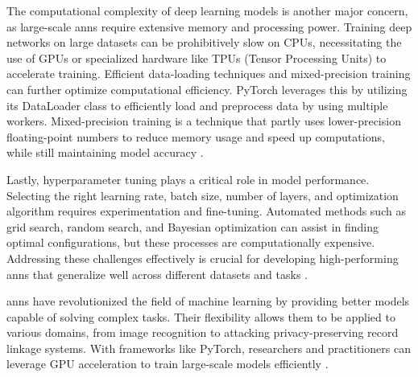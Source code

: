 The computational complexity of deep learning models is another major concern, as large-scale \ac{ann}s require extensive memory and processing power.
Training deep networks on large datasets can be prohibitively slow on CPUs, necessitating the use of GPUs or specialized hardware like TPUs (Tensor Processing Units) to accelerate training.
Efficient data-loading techniques and mixed-precision training can further optimize computational efficiency.
PyTorch leverages this by utilizing its DataLoader class to efficiently load and preprocess data by using multiple workers.
Mixed-precision training is a technique that partly uses lower-precision floating-point numbers to reduce memory usage and speed up computations, while still maintaining model accuracy \cite{pytorchPyTorch}.

Lastly, hyperparameter tuning plays a critical role in model performance.
Selecting the right learning rate, batch size, number of layers, and optimization algorithm requires experimentation and fine-tuning.
Automated methods such as grid search, random search, and Bayesian optimization can assist in finding optimal configurations, but these processes are computationally expensive.
Addressing these challenges effectively is crucial for developing high-performing \ac{ann}s that generalize well across different datasets and tasks \cite{pytorchPyTorch}.

\ac{ann}s have revolutionized the field of machine learning by providing better models capable of solving complex tasks.
Their flexibility allows them to be applied to various domains, from image recognition to attacking privacy-preserving record linkage systems.
With frameworks like PyTorch, researchers and practitioners can leverage GPU acceleration to train large-scale models efficiently \cite{pytorchPyTorch}.

